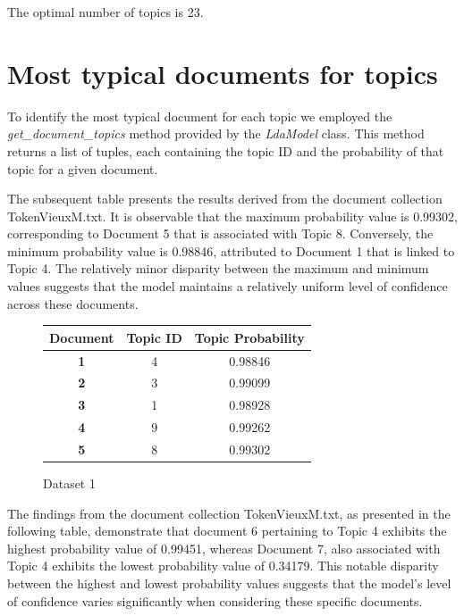 \documentclass[10pt]{article} %
\begin{document}
	The optimal number of topics is 23.
	
\section{Most typical documents for topics}
To identify the most typical document for each topic we employed the \textit{get\_document\_topics} method provided by the \textit{LdaModel} class. This method returns a list of tuples, each containing the topic ID and the probability of that topic for a given document. 

The subsequent table presents the results derived from the document collection TokenVieuxM.txt. It is observable that the maximum probability value is 0.99302, corresponding to Document 5 that is associated with Topic 8. Conversely, the minimum probability value is 0.98846, attributed to Document 1 that is linked to Topic 4. The relatively minor disparity between the maximum and minimum values suggests that the model maintains a relatively uniform level of confidence across these documents.

\begin{figure}[H]
	\centering
	\begin{tabular}{|c|c|c|}
		\hline \textbf{Document} & \textbf{Topic ID} & \textbf{Topic Probability}  \\  
		\hline \textbf{1} & 4 & 0.98846 \\
		\hline \textbf{2} & 3 & 0.99099 \\
		\hline \textbf{3} & 1 & 0.98928 \\
		\hline \textbf{4} & 9 & 0.99262 \\
		\hline \textbf{5} & 8 & 0.99302 \\
		\hline
	\end{tabular}
	\caption{Dataset 1}
\end{figure}

The findings from the document collection TokenVieuxM.txt, as presented in the following table, demonstrate that document 6 pertaining to Topic 4 exhibits the highest probability value of 0.99451, whereas Document 7, also associated with Topic 4 exhibits the lowest probability value of 0.34179. This notable disparity between the highest and lowest probability values suggests that the model's level of confidence varies significantly when considering these specific documents.
\end{document}
